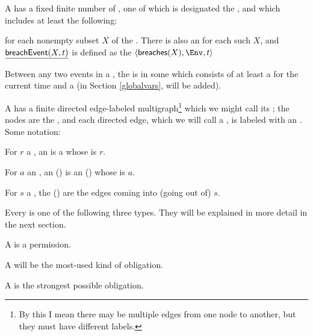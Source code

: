 \documentclass[12pt]{article}
\begin{document}
A \Contract has a fixed finite number of , one of which is designated the , and which includes at least the following:
\begin{LPPI}
\item {}
\item {} for each nonempty subset $X$ of the \Roles. There is also an \Action {} for each such $X$, and $\underline{\textsf{breachEvent}(X,t)}$ is defined as the \Event $\tup{\breaches{X}, \Env, t}$
\end{LPPI}
Between any two events in a \trace, the \Contract is in some  which consists of at least a \TimeStamp for the current time and a \State (in Section \ref{globalvars}, \GVars will be added).

A \Contract has a finite directed edge-labeled multigraph\footnote{By this I mean there may be multiple edges from one node to another, but they must have different labels.} which we might call its ; the nodes are the \States, and each directed edge, which we will call a , is labeled with an \Action. Some notation:
\begin{LPPI}
\item For $r$ a \Role, an  is a \transition whose \Role is $r$.
\item For $a$ an \Action, an  () is an \Event (\transition) whose \Action is $a$.
\item For $s$ a \State, the  () are the edges coming into (going out of) $s$.
\end{LPPI}
Every \transition is one of the following three types. They will be explained in more detail in the next section.
\begin{LPPI}
\item A  is a permission.
\item A  will be the most-used kind of obligation. 
\item A  is the strongest possible obligation. 
\end{LPPI}
\end{document}
